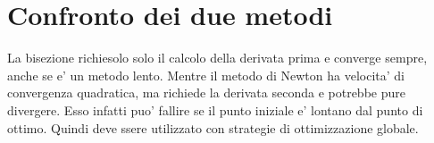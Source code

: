 \section{Confronto dei due metodi}

La bisezione richiesolo solo il calcolo della derivata prima e converge sempre, anche se e' un metodo lento.
Mentre il metodo di Newton ha velocita' di convergenza quadratica, ma richiede la derivata seconda e potrebbe pure divergere.
Esso infatti puo' fallire se il punto iniziale e' lontano dal punto di ottimo. Quindi deve ssere utilizzato con strategie di ottimizzazione globale.

